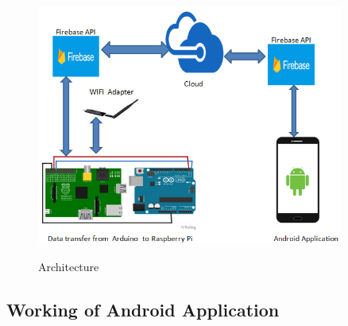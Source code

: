 \begin{figure}[!htbp]
	\centering
	\includegraphics[width=0.9\textwidth]{image1.png}
	\label{fig:Architecture}
	\caption{Architecture}
\end{figure}
 

\subsection{Working of Android Application}


